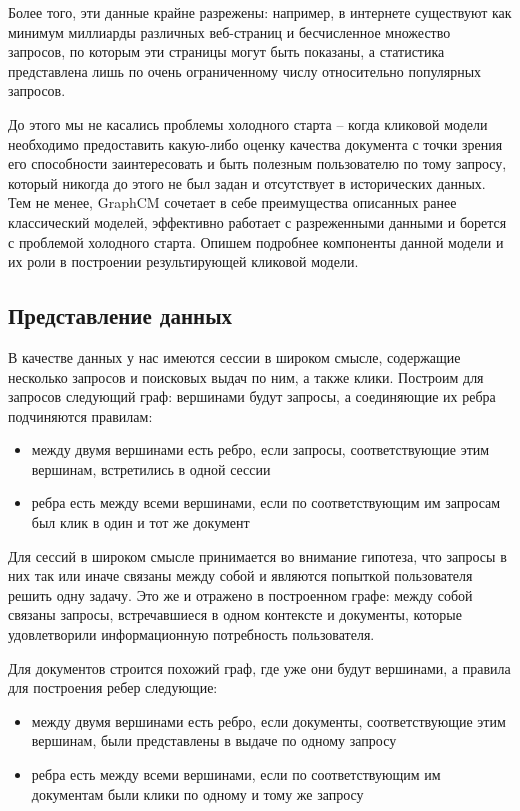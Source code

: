 \documentclass[diploma]{nanolab2015}
\begin{document}
Более того, эти данные крайне разрежены: например, в интернете существуют как минимум миллиарды различных веб-страниц и бесчисленное множество запросов, по которым эти страницы могут быть показаны, а статистика представлена лишь по очень ограниченному числу относительно популярных запросов.

До этого мы не касались проблемы холодного старта -- когда кликовой модели необходимо предоставить какую-либо оценку качества документа с точки зрения его способности заинтересовать и быть полезным пользователю по тому запросу, который никогда до этого не был задан и отсутствует в исторических данных. Тем не менее, GraphCM \cite{GraphCM} сочетает в себе преимущества описанных ранее классический моделей, эффективно работает с разреженными данными и борется с проблемой холодного старта. Опишем подробнее компоненты данной модели и их роли в построении результирующей кликовой модели.

\subsection{Представление данных}
В качестве данных у нас имеются сессии в широком смысле, содержащие несколько запросов и поисковых выдач по ним, а также клики. Построим для запросов следующий граф: вершинами будут запросы, а соединяющие их ребра подчиняются правилам:
\begin{itemize}
    \item между двумя вершинами есть ребро, если запросы, соответствующие этим вершинам, встретились в одной сессии
    \item ребра есть между всеми вершинами, если по соответствующим им запросам был клик в один и тот же документ
\end{itemize}

Для сессий в широком смысле принимается во внимание гипотеза, что запросы в них так или иначе связаны между собой и являются попыткой пользователя решить одну задачу. Это же и отражено в построенном графе: между собой связаны запросы, встречавшиеся в одном контексте и документы, которые удовлетворили информационную потребность пользователя.

Для документов строится похожий граф, где уже они будут вершинами, а правила для построения ребер следующие:
\begin{itemize}
    \item между двумя вершинами есть ребро, если документы, соответствующие этим вершинам, были представлены в выдаче по одному запросу
    \item ребра есть между всеми вершинами, если по соответствующим им документам были клики по одному и тому же запросу
\end{itemize}
\end{document}
